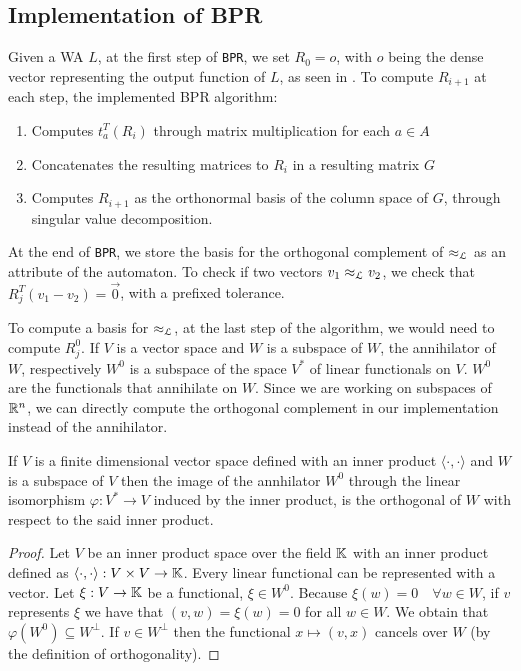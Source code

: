 
\subsection{Implementation of BPR}
Given a WA $L$, at the first step of \texttt{BPR}, we set $R_0 = o$, 
with $o$ being the dense vector representing the output function 
of $L$, as seen in \cite{BONCHI201277}.
To compute $R_{i+1}$ at each step, the implemented BPR algorithm:
\begin{enumerate}
    \item Computes $t_a^T(R_i)$ through matrix multiplication for each $a \in A$
    \item Concatenates the resulting matrices to $R_i$ in a resulting matrix $G$ 
    \item Computes $R_{i+1}$ as the orthonormal basis of the column space of $G$, through singular 
    value decomposition.
\end{enumerate}

At the end of \texttt{BPR}, we store the basis for the orthogonal complement
of $\approx_{\mathcal{L}}$ as an attribute of the automaton. To check if two vectors $v_1 \approx_{\mathcal{L}} v_2$,
we check that $R_j^T(v_1 - v_2) = \vec{0}$, with a prefixed tolerance.


To compute a basis for $\approx_{\mathcal{L}}$, at the last step of the algorithm,
we would need to compute $R_j^0$.
If $V$ is a vector space and $W$ is a
subspace of $W$, the annihilator of $W$, respectively $W^0$ is 
a subspace of the space $V^*$ of linear functionals on $V$.
$W^0$ are the functionals that annihilate on $W$. Since 
we are working on subspaces of $\mathbb{R}^n$, we can directly compute 
the orthogonal complement in our implementation instead of the
annihilator.


\begin{prop}
  If $V$ is a finite dimensional vector space defined with an inner product
  $\langle \cdot , \cdot \rangle$ and $W$ is a subspace of $V$
  then the image of the annhilator $W^0$ through the linear 
  isomorphism $\varphi: V^* \to V$ induced by the inner product, 
  is the orthogonal of $W$ with respect to the said inner product.
\end{prop}

\begin{proof}
  Let $V$ be an inner product space over the field $\mathbb{K}$ with an inner product defined as
  $\langle \cdot , \cdot \rangle : V \times V \to \mathbb{K}$. 
  Every linear functional can be 
  represented with a vector. Let $\xi : V \to \mathbb{K}$ be a functional, 
  $\xi \in  W^0$. Because $\xi(w)=0 \quad \forall  w \in W$, 
  if $v$ represents $\xi$ we have that $(v, w)=\xi(w)=0$ for all $w \in W$. 
  We obtain that $\varphi(W^0) \subseteq W^{\perp}$.
  If $v \in W^\perp$  
  then the functional $x \mapsto (v, x)$ cancels over $W$ 
  (by the definition of orthogonality).
\end{proof}

